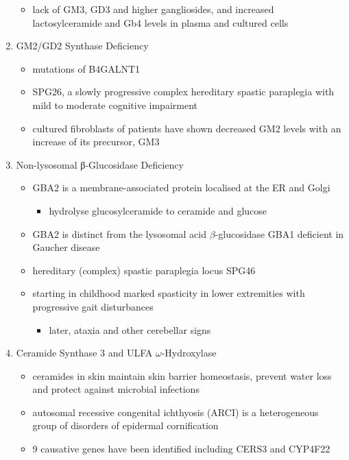 \documentclass{scrartcl}
\begin{document}
\begin{enumerate}
\begin{itemize}
\item lack of GM3, GD3 and higher gangliosides, and increased
lactosylceramide and Gb4 levels in plasma and cultured cells
\end{itemize}

\item GM2/GD2 Synthase Deficiency
\label{sec:org38469bb}

\begin{itemize}
\item mutations of B4GALNT1
\item SPG26, a slowly progressive complex hereditary spastic paraplegia
with mild to moderate cognitive impairment

\item cultured fibroblasts of patients have shown decreased GM2 levels
with an increase of its precursor, GM3
\end{itemize}

\item Non-lysosomal β-Glucosidase Deficiency
\label{sec:orgd269c5e}

\begin{itemize}
\item GBA2 is a membrane-associated protein localised at the ER and Golgi
\begin{itemize}
\item hydrolyse glucosylceramide to ceramide and glucose
\end{itemize}
\item GBA2 is distinct from the lysosomal acid \(\beta\)-glucosidase GBA1 deficient in Gaucher disease
\item hereditary (complex) spastic paraplegia locus SPG46
\item starting in childhood marked spasticity in lower extremities with
progressive gait disturbances
\begin{itemize}
\item later, ataxia and other cerebellar signs
\end{itemize}
\end{itemize}

\item Ceramide Synthase 3 and ULFA \(\omega\)-Hydroxylase
\label{sec:orgaa247a8}

\begin{itemize}
\item ceramides in skin maintain skin barrier homeostasis, prevent water
loss and protect against microbial infections
\item autosomal recessive congenital ichthyosis (ARCI) is a heterogeneous
group of disorders of epidermal cornification
\item 9 causative genes have been identified including CERS3 and CYP4F22


\end{itemize}
\end{enumerate}
\end{document}
